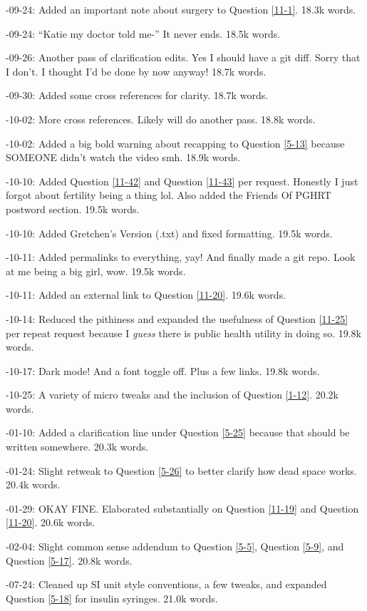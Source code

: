 \documentclass{article}
\begin{document}
-09-24: Added an important note about surgery to Question \ref{11-1}. 18.3k words.

-09-24: “Katie my doctor told me-” It never ends. 18.5k words.

-09-26: Another pass of clarification edits. Yes I should have a git diff. Sorry that I don't. I thought I'd be done by now anyway! 18.7k words.

-09-30: Added some cross references for clarity. 18.7k words.

-10-02: More cross references. Likely will do another pass. 18.8k words.

-10-02: Added a big bold warning about recapping to Question \ref{5-13} because SOMEONE didn't watch the video smh. 18.9k words.

-10-10: Added Question \ref{11-42} and Question \ref{11-43} per request. Honestly I just forgot about fertility being a thing lol. Also added the Friends Of PGHRT postword section. 19.5k words.

-10-10: Added Gretchen's Version (.txt) and fixed formatting. 19.5k words.

-10-11: Added permalinks to everything, yay! And finally made a git repo. Look at me being a big girl, wow. 19.5k words.

-10-11: Added an external link to Question \ref{11-20}. 19.6k words.

-10-14: Reduced the pithiness and expanded the usefulness of Question \ref{11-25} per repeat request because I \textit{guess} there is public health utility in doing so. 19.8k words.

-10-17: Dark mode! And a font toggle off. Plus a few links. 19.8k words.

-10-25: A variety of micro tweaks and the inclusion of Question \ref{1-12}. 20.2k words.

-01-10: Added a clarification line under Question \ref{5-25} because that should be written somewhere. 20.3k words.

-01-24: Slight retweak to Question \ref{5-26} to better clarify how dead space works. 20.4k words.

-01-29: OKAY FINE. Elaborated substantially on Question \ref{11-19} and Question \ref{11-20}. 20.6k words.

-02-04: Slight common sense addendum to Question \ref{5-5}, Question \ref{5-9}, and Question \ref{5-17}. 20.8k words.

-07-24: Cleaned up SI unit style conventions, a few tweaks, and expanded Question \ref{5-18} for insulin syringes. 21.0k words.
\end{document}
